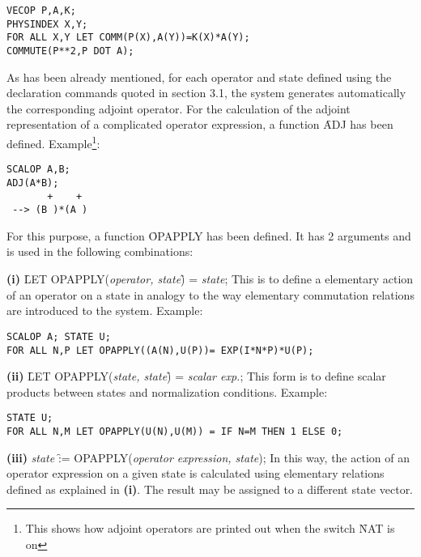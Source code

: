 \begin{verbatim}
VECOP P,A,K;
PHYSINDEX X,Y;
FOR ALL X,Y LET COMM(P(X),A(Y))=K(X)*A(Y);
COMMUTE(P**2,P DOT A);
\end{verbatim}


As has been already mentioned, for each operator and state defined
using the declaration commands quoted in section 3.1, the system
generates automatically the corresponding adjoint operator. For the
calculation of the adjoint representation of a complicated
operator expression, a function  \f{ADJ}  has been defined.
Example\footnote{This shows how adjoint operators are printed out
when the switch \f{NAT} is on}: 

\begin{verbatim}
SCALOP A,B;
ADJ(A*B);
       +    +
 --> (B )*(A )
\end{verbatim}


For this purpose, a function \f{OPAPPLY}  has been
defined.
It has 2 arguments and is used in the following combinations: 

\textbf{(i)}  \f{LET OPAPPLY(}{\it operator, state}\f{) =} {\it state};
This is to define a elementary
action of an operator on a state in analogy to the way
elementary commutation relations are introduced to the system.
Example:

\begin{verbatim}
SCALOP A; STATE U;
FOR ALL N,P LET OPAPPLY((A(N),U(P))= EXP(I*N*P)*U(P);
\end{verbatim}

{\bf (ii)} \f{LET OPAPPLY(}{\it state, state}\f{) =} {\it scalar exp.};
This form is to define scalar products between states and normalization
conditions.
Example:

\begin{verbatim}
STATE U;
FOR ALL N,M LET OPAPPLY(U(N),U(M)) = IF N=M THEN 1 ELSE 0;
\end{verbatim}

{\bf (iii)} {\it state} \f{:= OPAPPLY(}{\it operator expression, state});
 In this way, the action of an operator expression on a given state
is calculated using elementary relations defined as explained in {\bf
(i)}. The result may be assigned to a different state vector.

